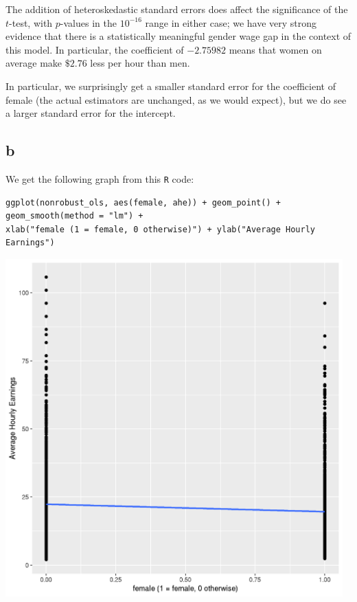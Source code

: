 \documentclass[12pt,letterpaper]{article}
\theoremstyle{definition}
\begin{document}
The addition of heteroskedastic standard errors does affect the significance of the \(t\)-test, with \(p\)-values in the \(10^{-16}\) range in either case; we have very strong evidence that there is a statistically meaningful gender wage gap in the context of this model. In particular, the coefficient of \(-2.75982\) means that women on average make \(\$2.76\) less per hour than men.

In particular, we surprisingly get a smaller standard error for the coefficient of female (the actual estimators are unchanged, as we would expect), but we do see a larger standard error for the intercept.

\subsection*{b}

We get the following graph from this \verb|R| code:

\begin{Verbatim}[fontsize=\small]
ggplot(nonrobust_ols, aes(female, ahe)) + geom_point() + geom_smooth(method = "lm") +
xlab("female (1 = female, 0 otherwise)") + ylab("Average Hourly Earnings")
\end{Verbatim}

\begin{center}
  \includegraphics[width=13cm]{./problem5.png}
\end{center}
\end{document}
